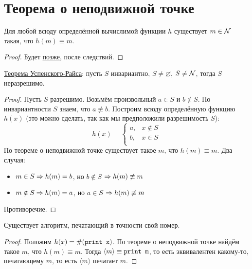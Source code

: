 \section{Теорема о неподвижной точке}

\begin{theorem}\label{fixedPoint}
	Для любой всюду определённой вычислимой функции $h$ существует $m \in \mathcal{N}$ такая, что $h(m) \equiv m$.
\end{theorem}
\begin{proof}
	Будет \hyperref[fixedPointProof]{позже}, после следствий.
\end{proof}

\begin{conseq}
	\hyperref[UspenskyRice]{Теорема Успенского-Райса}:
	пусть $S$ инвариантно, $S \ne \varnothing$, $S \ne \mathcal{N}$, тогда $S$ неразрешимо.
\end{conseq}
\begin{proof}
	Пусть $S$ разрешимо.
	Возьмём произвольный $a \in S$ и $b \notin S$.
	По инвариантности $S$ знаем, что $a \not\equiv b$.
	Построим всюду определённую функцию $h(x)$ (это можно сделать, так как мы предположили разрешимость $S$):
	\[
		h(x) =
		\begin{cases}
			a, &x \notin S \\
			b, &x \in S \\
		\end{cases}
	\]
	По теореме о неподвижной точке существует такое $m$, что $h(m) \equiv m$.
	Два случая:
	\begin{itemize}
		\item
			$m \in S \Rightarrow h(m) = b$, но $b \notin S$ $\Rightarrow h(m) \not\equiv m$
		\item
			$m \notin S \Rightarrow h(m) = a$, но $a \in S$ $\Rightarrow h(m) \not\equiv m$
	\end{itemize}
	Противоречие.
\end{proof}

\begin{conseq}
	Существует алгоритм, печатающий в точности свой номер.
\end{conseq}
\begin{proof}
	Положим $h(x) = \#(\texttt{print x})$.
	По теореме о неподвижной точке найдём такое $m$, что $h(m) \equiv m$.
	Тогда $\langle m \rangle \equiv \texttt{print m}$, то есть эквивалентен какому-то, печатающему $m$, то есть $\langle m \rangle$ печатает $m$.
\end{proof}

